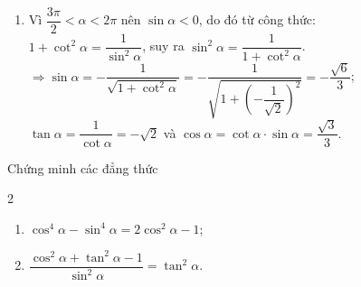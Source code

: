 \begin{bt}
{\begin{enumerate}
		$1+\tan^2\alpha=\dfrac{1}{\cos^2\alpha}$, suy ra $\cos^2\alpha=\dfrac{1}{1+\tan^2\alpha}$.\\
		$\Rightarrow\cos\alpha=-\dfrac{1}{\sqrt{1+\tan^2\alpha}}=-\dfrac{1}{\sqrt{1+(\sqrt{5})^2}}=-\dfrac{\sqrt{6}}{6}$;\\ $\cot\alpha=\dfrac{1}{\tan\alpha}=\dfrac{\sqrt{5}}{5}$ và $\sin\alpha=\tan\alpha\cdot\cos\alpha=-\dfrac{\sqrt{30}}{6}$.
		\item 
		Vì $\dfrac{3\pi}{2}<\alpha<2\pi$ nên $\sin\alpha<0$, do đó từ công thức:\\
		$1+\cot^2\alpha=\dfrac{1}{\sin^2\alpha}$, suy ra $\sin^2\alpha=\dfrac{1}{1+\cot^2\alpha}$.\\
		$\Rightarrow\sin\alpha=-\dfrac{1}{\sqrt{1+\cot^2\alpha}}=-\dfrac{1}{\sqrt{1+\left(-\dfrac{1}{\sqrt{2}}\right)^2}}=-\dfrac{\sqrt{6}}{3}$;\\ $\tan\alpha=\dfrac{1}{\cot\alpha}=-\sqrt{2}$ và $\cos\alpha=\cot\alpha\cdot\sin\alpha=\dfrac{\sqrt{3}}{3}$.
		\end{enumerate}
	}
\end{bt}

\begin{bt}%

	Chứng minh các đẳng thức
	\begin{multicols}{2}
		\begin{enumerate}
			\item $\cos^4\alpha-\sin^4\alpha=2\cos^2\alpha-1$;
			\item $\dfrac{\cos^2\alpha+\tan^2\alpha-1}{\sin^2\alpha}=\tan^2\alpha$.
		\end{enumerate}
	\end{multicols}
\end{bt}

